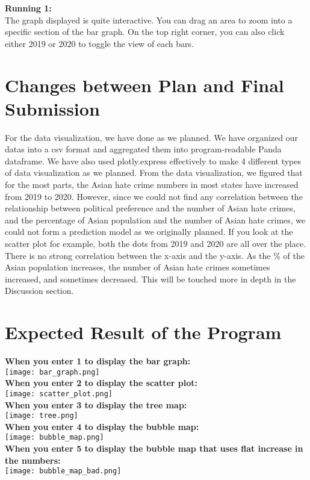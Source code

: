 \documentclass[fontsize=11pt]{article}
\begin{document}
\textbf{Running 1: }\\
The graph displayed is quite interactive. You can drag an area to zoom into a specific section of the bar graph. On the top right corner, you can also click either 2019 or 2020 to toggle the view of each bars.
\section*{Changes between Plan and Final Submission}

For the data visualization, we have done as we planned. We have organized our datas into a csv format and aggregated them into program-readable Panda dataframe. We have also used plotly.express effectively to make 4 different types of data visualization as we planned. From the data visualization, we figured that for the most parts, the Asian hate crime numbers in most states have increased from 2019 to 2020. However, since we could not find any correlation between the relationship between political preference and the number of Asian hate crimes, and the percentage of Asian population and the number of Asian hate crimes, we could not form a prediction model as we originally planned. If you look at the scatter plot for example, both the dots from 2019 and 2020 are all over the place. There is no strong correlation between the x-axis and the y-axis. As the \% of the Asian population increases, the number of Asian hate crimes sometimes increased, and sometimes decreased. This will be touched more in depth in the Discussion section.

\section*{Expected Result of the Program}

\textbf{When you enter 1 to display the bar graph: }\\
\texttt{[image: bar\_graph.png]}\\
\textbf{When you enter 2 to display the scatter plot: }\\
\texttt{[image: scatter\_plot.png]}\\
\textbf{When you enter 3 to display the tree map: }\\
\texttt{[image: tree.png]}\\
\textbf{When you enter 4 to display the bubble map: }\\
\texttt{[image: bubble\_map.png]}\\
\textbf{When you enter 5 to display the bubble map that uses flat increase in the numbers: }\\
\texttt{[image: bubble\_map\_bad.png]}
\end{document}
